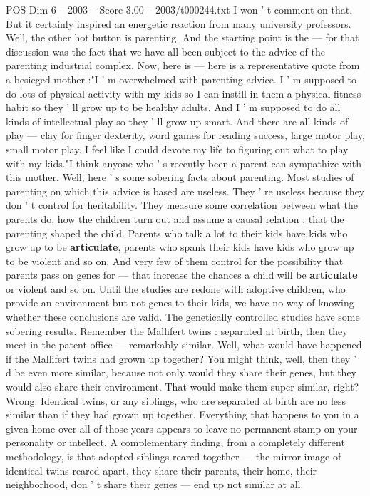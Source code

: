 \begin{textsample}{POS Dim 6 – 2003 – Score 3.00 – 2003/t000244.txt}
I won ' t comment on that.
But it certainly inspired an energetic reaction from many university professors.
Well, the other hot button is parenting.
And the starting point is the — for that discussion was the fact that we have all been subject to the advice of the parenting industrial complex.
Now, here is — here is a representative quote from a besieged mother :"I ' m overwhelmed with parenting advice.
I ' m supposed to do lots of physical activity with my kids so I can instill in them a physical fitness habit so they ' ll grow up to be healthy adults.
And I ' m supposed to do all kinds of intellectual play so they ' ll grow up smart.
And there are all kinds of play — clay for finger dexterity, word games for reading success, large motor play, small motor play.
I feel like I could devote my life to figuring out what to play with my kids."I think anyone who ' s recently been a parent can sympathize with this mother.
Well, here ' s some sobering facts about parenting.
Most studies of parenting on which this advice is based are useless.
They ' re useless because they don ' t control for heritability.
They measure some correlation between what the parents do, how the children turn out and assume a causal relation : that the parenting shaped the child.
Parents who talk a lot to their kids have kids who grow up to be \textbf{articulate}, parents who spank their kids have kids who grow up to be violent and so on.
And very few of them control for the possibility that parents pass on genes for — that increase the chances a child will be \textbf{articulate} or violent and so on.
Until the studies are redone with adoptive children, who provide an environment but not genes to their kids, we have no way of knowing whether these conclusions are valid.
The genetically controlled studies have some sobering results.
Remember the Mallifert twins : separated at birth, then they meet in the patent office — remarkably similar.
Well, what would have happened if the Mallifert twins had grown up together?
You might think, well, then they ' d be even more similar, because not only would they share their genes, but they would also share their environment.
That would make them super-similar, right?
Wrong.
Identical twins, or any siblings, who are separated at birth are no less similar than if they had grown up together.
Everything that happens to you in a given home over all of those years appears to leave no permanent stamp on your personality or intellect.
A complementary finding, from a completely different methodology, is that adopted siblings reared together — the mirror image of identical twins reared apart, they share their parents, their home, their neighborhood, don ' t share their genes — end up not similar at all.

\end{textsample}
